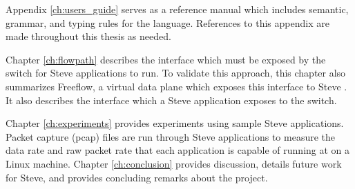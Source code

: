 Appendix \ref{ch:users_guide} serves as a reference
manual which includes semantic, grammar, and typing rules for the language. References to this appendix are made throughout this thesis as needed.

Chapter \ref{ch:flowpath} describes the interface which must be exposed by the switch for Steve applications to run. To validate this approach, this chapter also summarizes Freeflow, a virtual data plane which exposes this interface to Steve \cite{freeflow_software}. It also describes the interface which a Steve application exposes to the switch.

Chapter \ref{ch:experiments} provides experiments using sample Steve
applications. Packet capture (pcap) files are run through Steve applications to measure the data
rate and raw packet rate that each application is capable of running at on a
Linux machine.
Chapter \ref{ch:conclusion} provides discussion, details future work for Steve, and provides concluding remarks about the project.
